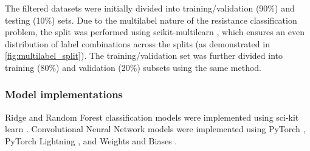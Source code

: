 \documentclass[english,11pt,a4paper,titlepage]{article}
\begin{document}
	The filtered datasets were initially divided into training/validation (90\%) and testing (10\%) sets. Due to the multilabel nature of the resistance classification problem, the split was performed using scikit-multilearn \cite{2017arXiv170201460S}, which ensures an even distribution of label combinations across the splits (as demonstrated in \ref{fig:multilabel_split}). The training/validation set was further divided into training (80\%) and validation (20\%) subsets using the same method.
	
	\subsubsection*{Model implementations}
	Ridge and Random Forest classification models were implemented using sci-kit learn \cite{scikit-learn}. Convolutional Neural Network models were implemented using PyTorch \cite{NEURIPS2019_9015}, PyTorch Lightning \cite{falcon2019pytorch}, and Weights and Biases \cite{wandb}.
	
\end{document}
